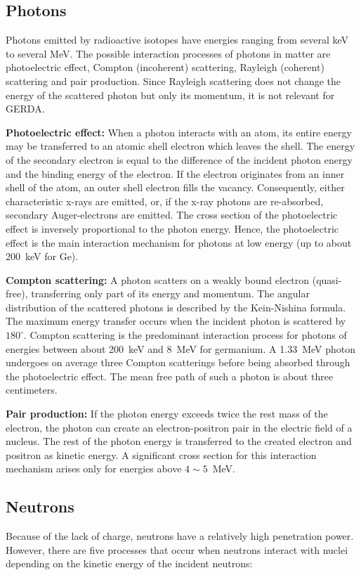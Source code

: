 \subsection{Photons}
\label{sec:det:gamma}
Photons emitted by radioactive isotopes have energies ranging from
several keV to several MeV. The possible interaction processes of
photons in matter are photoelectric effect, Compton (incoherent)
scattering, Rayleigh (coherent) scattering and pair production. Since
Rayleigh scattering does not change the energy of the scattered photon
but only its momentum, it is not relevant for GERDA.

\textbf{Photoelectric effect:} When a photon interacts with an atom,
its entire energy may be transferred to an atomic shell electron which
leaves the shell. The energy of the secondary electron is equal to the
difference of the incident photon energy and the binding energy of the
electron. If the electron originates from an inner shell of the atom,
an outer shell electron fills the vacancy. Consequently, either
characteristic x-rays are emitted, or, if the x-ray photons are
re-absorbed, secondary Auger-electrons are emitted. The cross section
of the photoelectric effect is inversely proportional to the photon
energy. Hence, the photoelectric effect is the main interaction
mechanism for photons at low energy (up to about 200~keV for Ge).

\textbf{Compton scattering:} A photon scatters on a weakly bound
electron (quasi-free), transferring only part of its energy and
momentum. The angular distribution of the scattered photons is
described by the Kein-Nishina formula. The maximum energy transfer
occurs when the incident photon is scattered by $180^{\circ}$. Compton
scattering is the predominant interaction process for photons of
energies between about 200~keV and 8~MeV for germanium. A 1.33~MeV
photon undergoes on average three Compton scatterings before being
absorbed through the photoelectric effect. The mean free path of such
a photon is about three centimeters.

\textbf{Pair production:} If the photon energy exceeds twice the rest
mass of the electron, the photon can create an electron-positron pair
in the electric field of a nucleus. The rest of the photon energy is
transferred to the created electron and positron as kinetic energy. A
significant cross section for this interaction mechanism arises only
for energies above $4\sim5$~MeV.

\subsection{Neutrons}
\label{sec:det:neutron}
Because of the lack of charge, neutrons have a relatively high
penetration power. However, there are five processes that occur when
neutrons interact with nuclei depending on the kinetic energy of the
incident neutrons:


